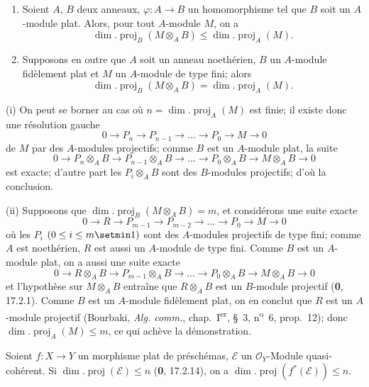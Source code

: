 \begin{proposition}[6.2.1]
\label{IV.2.s6.2.1-fr}
\begin{enumerate}
\item[\textup{(i)}] Soient $A$, $B$ deux anneaux, $\varphi:A\to B$ un homomorphisme tel
que $B$ soit un $A$-module plat. Alors, pour tout $A$-module $M$, on a
\begin{equation}
\dim.\operatorname{proj}_B(M\otimes_AB)
\leq\dim.\operatorname{proj}_A(M).
\tag{6.2.1.1}\label{IV.2.s6.2.1.1-fr}
\end{equation}
\item[\textup{(ii)}] Supposons en outre que $A$ soit un anneau noethérien, $B$ un
$A$-module fidèlement plat et $M$ un $A$-module de type fini; alors
\begin{equation}
\dim.\operatorname{proj}_B(M\otimes_AB)
=\dim.\operatorname{proj}_A(M).
\tag{6.2.1.2}\label{IV.2.s6.2.1.2-fr}
\end{equation}
\end{enumerate}
\end{proposition}

(i) On peut se borner au cas où
$n=\dim.\operatorname{proj}_A(M)$ est finie; il existe donc une résolution
gauche
\[
0\to P_n\to P_{n-1}\to\ldots\to P_0\to M\to0
\]
de $M$ par des $A$-modules projectifs; comme $B$ est un $A$-module plat, la
suite
\[
0\to P_n\otimes_AB\to P_{n-1}\otimes_AB\to\ldots\to
P_0\otimes_AB\to M\otimes_AB\to0
\]
est exacte; d'autre part les $P_i\otimes_AB$ sont des $B$-modules projectifs;
d'où la conclusion.

(ii) Supposons que $\dim.\operatorname{proj}_B(M\otimes_AB)=m$, et considérons
une suite exacte
\[
0\to R\to P_{m-1}\to P_{m-2}\to\ldots\to P_0\to M\to0
\]
où les $P_i$ $(0\leq i\leq m\setmin 1)$ sont des $A$-modules projectifs de type fini;
comme $A$ est noethérien, $R$ est aussi un $A$-module de type fini. Comme $B$
est un $A$-module plat, on a aussi une suite exacte
\[
0\to R\otimes_AB\to P_{m-1}\otimes_AB\to\ldots\to
P_0\otimes_AB\to M\otimes_AB\to0
\]
et l'hypothèse sur $M\otimes_AB$ entraîne que $R\otimes_AB$ est un $B$-module
projectif (\textbf{0}, 17.2.1). Comme $B$ est un $A$-module fidèlement plat, on en
conclut que $R$ est un $A$-module projectif (Bourbaki, \emph{Alg. comm.},
chap.~I\textsuperscript{er}, §~3, n\textsuperscript{o}~6, prop.~12); donc
$\dim.\operatorname{proj}_A(M)\leq m$, ce qui achève la démonstration.

\begin{corollary}[6.2.2]
\label{IV.2.s6.2.2-fr}
Soient $f:X\to Y$ un morphisme plat de préschémas, $\mathscr E$ un
$\mathcal O_Y$-Module quasi-cohérent. Si
$\dim.\operatorname{proj}(\mathscr E)\leq n$ \textup{(\textbf{0}, 17.2.14)}, on a
$\dim.\operatorname{proj}(f^*(\mathscr E))\leq n$.
\end{corollary}

